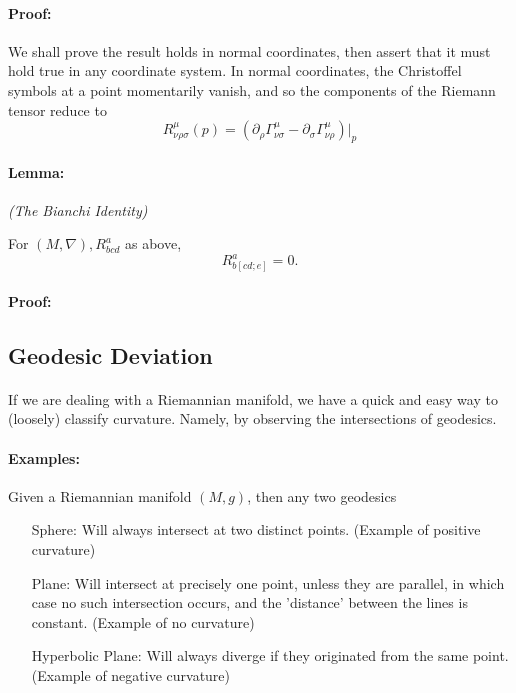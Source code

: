 \documentclass[11pt,fleqn]{report}
\begin{document}
\paragraph{Proof:} We shall prove the result holds in normal coordinates, then assert that it must hold true in any coordinate system. In normal coordinates, the Christoffel symbols at a point momentarily vanish, and so the components of the Riemann tensor reduce to
	\begin{equation}
		R^\mu_{\nu\rho\sigma}(p) = \left(\partial_\rho \Gamma^\mu_{\nu\sigma} - \partial_\sigma \Gamma^\mu_{\nu\rho} \right) \vert_p
	\end{equation}

\paragraph{Lemma:}\textit{(The Bianchi Identity)}

For $(M,\nabla), R^a_{bcd}$ as above,
	\begin{equation}
		R^a_{b[cd;e]} = 0.
	\end{equation}
	
\paragraph{Proof:}

\subsection{Geodesic Deviation}
\paragraph{} If we are dealing with a Riemannian manifold, we have a quick and easy way to (loosely) classify curvature. Namely, by observing the intersections of geodesics.

\paragraph{Examples:} Given a Riemannian manifold $(M,g)$, then any two geodesics
	\begin{enumerate}
		\item[Sphere:] Will always intersect at two distinct points. (Example of positive curvature)
		\item[Plane:] Will intersect at precisely one point, unless they are parallel, in which case no such intersection occurs, and the 'distance' between the lines is constant. (Example of no curvature)
		\item[Hyperbolic Plane:] Will always diverge if they originated from the same point. (Example of negative curvature)
	\end{enumerate}
	
\end{document}
